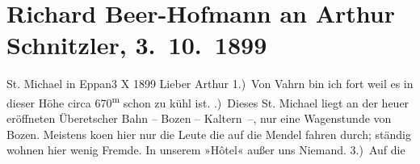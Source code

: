 

         
         \renewcommand{\erwaehntePersonen}{Personen: Richard Beer-Hofmann, Otto Brahm}
         \renewcommand{\erwaehnteInstitutionen}{Institutionen: Überetscher Bahn}
         \renewcommand{\erwaehnteOrte}{Orte: Bozen, Caldaro sulla strada del vino, Eppaner Hof, Mendelpass, Sankt Michael, Vahrn}
         \renewcommand{\erwaehnteWerke}{Werke: Der Graf von Charolais. Ein Trauerspiel}
               \section[Richard Beer-Hofmann an Arthur Schnitzler, 3. 10. 1899]{ Richard Beer-Hofmann an Arthur Schnitzler, 3. 10. 1899}\nopagebreak{}\rehead{ }\begin{ledgroupsized}[t]{13cm}\normalsize\beginnumbering{} \toendnotes[C]{\smallbreak\pagebreak[2]} 
\toendnotes[C]{\smallbreak}\pstart
           \raggedleft{}{\pb}St. Michael in Eppan3 X 1899\pend
           \pstart
           Lieber Arthur 1.) Von Vahrn bin
               ich fort weil es in dieser Höhe circa 670\textsuperscript{m} schon zu kühl
               ist.\pend
           .) Dieses St. Michael liegt an der heuer
               eröffneten Überetscher Bahn – Bozen – Kaltern –, nur
               eine Wagenstunde von Bozen. Meistens ko{\geminationm}en hier nur die Leute die auf die Mendel fahren durch; ständig wohnen hier wenig Fremde. In
               unserem »Hôtel« außer uns Niemand. 3.) Auf die

\end{ledgroupsized}
